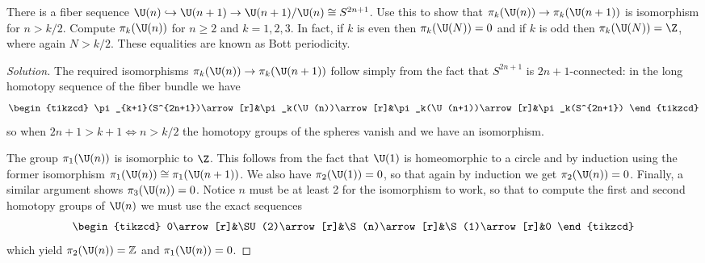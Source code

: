 \begin{exercise}
	There is a fiber sequence $\U(n)\hookrightarrow\U(n+1)\to\U(n+1)/\U(n)\cong S^{2n+1}$. Use this to show that $\pi_k(\U(n))\to\pi_k(\U(n+1))$ is isomorphism for $n>k/2$. Compute $\pi_k(\U(n))$ for $n\geq 2$ and $k=1,2,3$. In fact, if $k$ is even then $\pi_k(\U(N))=0$ and if $k$ is odd then $\pi_k(\U(N))=\Z$, where again $N>k/2$. These equalities are known as Bott periodicity.
\end{exercise}
\begin{proof}[Solution]
	The required isomorphisms $\pi_k(\U(n))\to\pi_k(\U(n+1))$ follow simply from the fact that $S^{2n+1}$ is $2n+1$-connected: in the long homotopy sequence of the fiber bundle we have
	\[\begin{tikzcd}
		\pi_{k+1}(S^{2n+1})\arrow[r]&\pi_k(\U(n))\arrow[r]&\pi_k(\U(n+1))\arrow[r]&\pi_k(S^{2n+1})
	\end{tikzcd}\]
	so when $2n+1>k+1\iff n>k/2$ the homotopy groups of the spheres vanish and we have an isomorphism.
	
	The group $\pi_1(\U(n))$ is isomorphic to $\Z$. This follows from the fact that $\U(1)$ is homeomorphic to a circle and by induction using the former isomorphism $\pi_1(\U(n))\cong\pi_1(\U(n+1))$. We also have $\pi_2(\U(1))=0$, so that again by induction we get $\pi_2(\U(n))=0$. Finally, a similar argument shows $\pi_3(\U(n))=0$. Notice $n$ must be at least 2 for the isomorphism to work, so that to compute the first and second homotopy groups of $\U(n)$ we must use the exact sequences
\[\begin{tikzcd}
	0\arrow[r]&\SU(2)\arrow[r]&\S(n)\arrow[r]&\S(1)\arrow[r]&0
\end{tikzcd}\]
which yield $\pi_{2}(\U(n))=\mathbb{Z}$ and $\pi_{1}(\U(n))=0$.
\end{proof}


